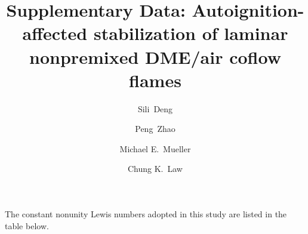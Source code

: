 \documentclass[review,3p,times]{elsarticle}
\begin{document}
\begin{frontmatter}

\title{Supplementary Data: Autoignition-affected stabilization of laminar nonpremixed DME/air coflow flames}

\author{Sili~Deng}
\author{Peng~Zhao}
\author{Michael E.~Mueller}
\author{Chung K.~Law}

\address{Department of Mechanical and Aerospace Engineering, Princeton University, Princeton, NJ 08544, USA}

\end{frontmatter}

\noindent The constant nonunity Lewis numbers adopted in this study are listed in the table below.
\end{document}
